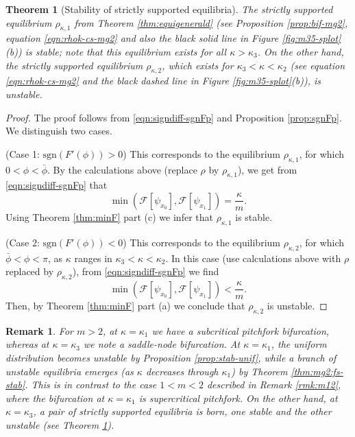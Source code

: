 \documentclass[11pt]{amsart}
\newtheorem{theorem}{Theorem}[section]
\newtheorem{remark}{Remark}[section]
\begin{document}
\begin{theorem}[Stability of strictly supported equilibria]
\label{thm:mg2:cs-stab}
The strictly supported equilibrium $\rho_{\kappa,1}$ from Theorem \ref{thm:equigenerald} (see Proposition \ref{prop:bif-mg2}, equation \eqref{eqn:rhok-cs-mg2} and also the black solid line in Figure \ref{fig:m35-splot}(b)) is stable; note that this equilibrium exists for all $\kappa>\kappa_3$. On the other hand, the strictly supported equilibrium $\rho_{\kappa,2}$, which exists for $\kappa_3<\kappa<\kappa_2$ (see equation \eqref{eqn:rhok-cs-mg2} and the black dashed line in Figure \ref{fig:m35-splot}(b)), is unstable.
\end{theorem}
\begin{proof}
The proof follows from \eqref{eqn:signdiff-sgnFp} and Proposition \ref{prop:sgnFp}. We distinguish two cases.
\smallskip

\noindent(Case 1: $\mathrm{sgn}\left(F'(\phi)\right)>0$) This corresponds to the equilibrium $\rho_{\kappa,1}$, for which $0<\phi < \bar{\phi}$. By the calculations above (replace $\rho$ by $\rho_{\kappa,1}$), we get from \eqref{eqn:signdiff-sgnFp} that
\[
\min(\mathcal{F}[\psi_{x_0}],\mathcal{F}[\psi_{x_1}])=\frac{\kappa}{m}.
\]
Using Theorem \ref{thm:minF} part (c) we infer that $\rho_{\kappa,1}$ is stable.
\medskip

\noindent(Case 2: $\mathrm{sgn}\left(F'(\phi)\right)<0$) This corresponds to the equilibrium $\rho_{\kappa,2}$, for which $\bar{\phi}<\phi < \pi$, as $\kappa$ ranges in $\kappa_3<\kappa<\kappa_2$. In this case (use calculations above with $\rho$ replaced by $\rho_{\kappa,2}$), from \eqref{eqn:signdiff-sgnFp} we find
\[
\min(\mathcal{F}[\psi_{x_0}],\mathcal{F}[\psi_{x_1}])<\frac{\kappa}{m}.
\]
Then, by Theorem \ref{thm:minF} part (a) we conclude that $\rho_{\kappa,2}$ is unstable.
\end{proof}

\begin{remark}
For $m>2$, at $\kappa=\kappa_1$ we have a subcritical pitchfork bifurcation, whereas at $\kappa=\kappa_3$ we note a saddle-node bifurcation. At $\kappa=\kappa_1$, the uniform distribution becomes unstable by Proposition \ref{prop:stab-unif}, while a branch of unstable equilibria emerges (as $\kappa$ decreases through $\kappa_1$) by Theorem \ref{thm:mg2:fs-stab}. This is in contrast to the case $1<m<2$ described in Remark \ref{rmk:m12}, where the bifurcation at $\kappa=\kappa_1$ is supercritical pitchfork. On the other hand, at $\kappa=\kappa_3$, a pair of strictly supported equilibria is born, one stable and the other unstable (see Theorem \ref{thm:mg2:cs-stab}).
\end{remark}
\end{document}
